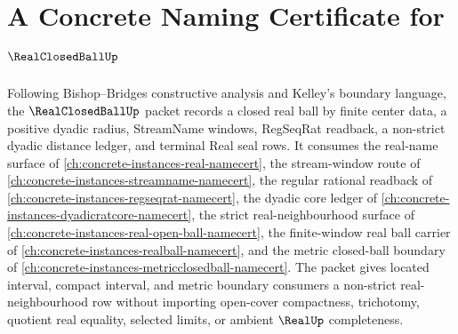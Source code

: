 \chapter{A Concrete Naming Certificate for $\RealClosedBallUp$}
\label{ch:concrete-instances-real-closed-ball-namecert}

Following Bishop--Bridges constructive analysis and Kelley's boundary language, the $\RealClosedBallUp$ packet records a closed real ball by finite center data, a positive dyadic radius, StreamName windows, RegSeqRat readback, a non-strict dyadic distance ledger, and terminal Real seal rows. It consumes the real-name surface of \autoref{ch:concrete-instances-real-namecert}, the stream-window route of \autoref{ch:concrete-instances-streamname-namecert}, the regular rational readback of \autoref{ch:concrete-instances-regseqrat-namecert}, the dyadic core ledger of \autoref{ch:concrete-instances-dyadicratcore-namecert}, the strict real-neighbourhood surface of \autoref{ch:concrete-instances-real-open-ball-namecert}, the finite-window real ball carrier of \autoref{ch:concrete-instances-realball-namecert}, and the metric closed-ball boundary of \autoref{ch:concrete-instances-metricclosedball-namecert}. The packet gives located interval, compact interval, and metric boundary consumers a non-strict real-neighbourhood row without importing open-cover compactness, trichotomy, quotient real equality, selected limits, or ambient $\RealUp$ completeness.

